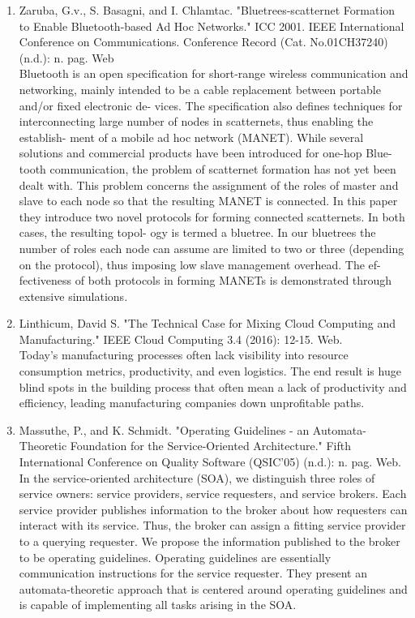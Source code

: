 \documentclass[oneside,a4paper,12pt]{report}
\begin{document}
\begin{enumerate}

\item Zaruba, G.v., S. Basagni, and I. Chlamtac. "Bluetrees-scatternet Formation to Enable Bluetooth-based Ad Hoc Networks." ICC 2001. IEEE International Conference on Communications. Conference Record (Cat. No.01CH37240) (n.d.): n. pag. Web\\
Bluetooth is an open specification for short-range
wireless communication and networking, mainly intended to be
a cable replacement between portable and/or fixed electronic de-
vices. The specification also defines techniques for interconnecting
large number of nodes in scatternets, thus enabling the establish-
ment of a mobile ad hoc network (MANET). While several solutions
and commercial products have been introduced for one-hop Blue-
tooth communication, the problem of scatternet formation has not
yet been dealt with. This problem concerns the assignment of the
roles of master and slave to each node so that the resulting MANET
is connected. In this paper they introduce two novel protocols for
forming connected scatternets. In both cases, the resulting topol-
ogy is termed a bluetree. In our bluetrees the number of roles each
node can assume are limited to two or three (depending on the
protocol), thus imposing low slave management overhead. The ef-
fectiveness of both protocols in forming MANETs is demonstrated
through extensive simulations.\\
\item Linthicum, David S. "The Technical Case for Mixing Cloud Computing and Manufacturing." IEEE Cloud Computing 3.4 (2016): 12-15. Web.\\
Today’s manufacturing processes often lack visibility into resource consumption metrics, productivity, and even logistics. The end result is huge blind spots in the building process that often mean a lack of productivity and efficiency, leading manufacturing companies down unprofitable paths.\\
\item Massuthe, P., and K. Schmidt. "Operating Guidelines - an Automata-Theoretic Foundation for the Service-Oriented Architecture." Fifth International Conference on Quality Software (QSIC'05) (n.d.): n. pag. Web.\\
In the service-oriented architecture (SOA), we distinguish three roles of service owners: service providers, service requesters, and service brokers. Each service provider publishes information to the broker about how requesters can interact with its service. Thus, the broker can assign a fitting service provider to a querying requester. We propose the information published to the broker to be operating guidelines. Operating guidelines are essentially communication instructions for the service requester.
They present an automata-theoretic approach that is centered around operating guidelines and is capable of implementing all tasks arising in the SOA.\\


\end{enumerate}
\end{document}
